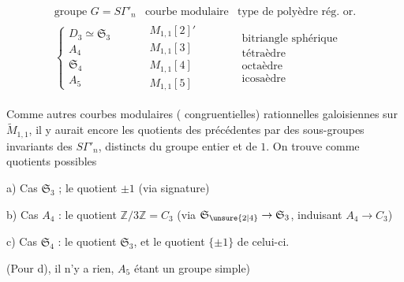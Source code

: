 \[
\begin{array}{lll}
\text{groupe }G=S\Gamma'_n & \text{courbe modulaire} & \text{type de polyèdre rég. or.}\\[.5em]
\left\{\begin{array}{l}D_3\simeq\mathfrak S_3\\ A_4\\ \mathfrak S_4\\ A_5\end{array}\right.
&\begin{array}{l}M_{1,1}[2]'\\M_{1,1}[3]\\M_{1,1}[4]\\M_{1,1}[5]\end{array}
&\begin{array}{l}\text{bitriangle sphérique}\\\text{tétraèdre}\\\text{octaèdre}\\\text{icosaèdre}\end{array}
\end{array}
\tag{75}
\]

Comme autres courbes modulaires ( congruentielles)
rationnelles galoisiennes sur $\widetilde M_{1,1}$, il y aurait encore
les quotients des précédentes par des sous-groupes
invariants des $S\Gamma'_n$, distincts du groupe entier et de $1$.
On trouve comme quotients possibles

\noindent a) Cas $\mathfrak S_3$ ; le quotient $\pm1$ (via signature)

\noindent b) Cas $A_4$ : le quotient $\mathbb Z/3\mathbb Z=C_3$
(via $\mathfrak S_{\unsure{2|4}}\to\mathfrak S_3$, induisant $A_4\to C_3$)

\noindent c) Cas $\mathfrak S_4$ : le quotient $\mathfrak S_3$, et le quotient $\{\pm1\}$ de celui-ci.

(Pour d), il n'y a rien, $A_5$ étant un groupe simple)


